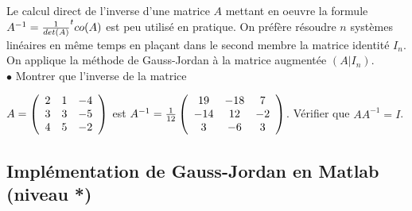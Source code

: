 \documentclass[a4paper, 10pt]{article}
\begin{document}
Le calcul direct de l'inverse d'une matrice $A$ mettant en oeuvre la formule
$A^{-1}= {1 \over det(A)} ^tco(A)$ est peu utilisé en pratique. 
On préfère résoudre $n$ systèmes linéaires en même temps en plaçant dans le second membre
la matrice identité $I_n$. On applique la méthode de Gauss-Jordan à la matrice augmentée $(A| I_n)$.
\\

 $\bullet$ Montrer que l'inverse de la matrice 

$A=\left(
\begin{array}{c c c }
2  & 1   & -4  \\
3  & 3   & -5   \\
4  & 5  &  -2  \\ 
\end{array}
\right)$
est 
$A^{-1}= {1 \over 12} \left(
\begin{array}{c c c }
19  & -18   & 7  \\
-14  & 12   & -2   \\
3  & -6  &  3  \\ 
\end{array}
\right)$.
Vérifier que $A A^{-1}=I$.

\subsection{Implémentation de Gauss-Jordan en Matlab (niveau *)}
\end{document}
